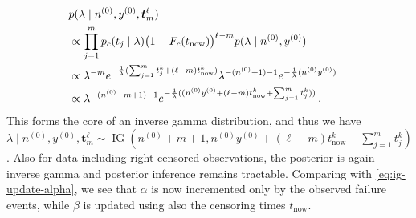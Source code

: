\documentclass[12pt,a4paper,twocolumn,fleqn]{narms}
\renewcommand{\vec}[1]{{\bm#1}}
\newcommand{\uz}{^{(0)}} %
\newcommand{\ig}{\operatorname{IG}}   %
\def\yz{y\uz}
\def\nz{n\uz}
\begin{document}
\begin{align}
\lefteqn{p(\lambda \mid \nz, \yz, \vec{t}_m^\ell)} \\
	&\propto \prod_{j=1}^{m} p_c(t_j \mid \lambda) \big(1 - F_c(t_\text{now})\big)^{\ell-m} p(\lambda\mid \nz, \yz) \\
	&\propto \lambda^{-m} e^{-\frac{1}{\lambda}(\sum_{j=1}^{m} t_j^k + (\ell-m) t_\text{now}^k)}
           \lambda^{-(\nz+1)-1}   e^{-\frac{1}{\lambda}(\nz \yz)} \\
	&\propto \lambda^{-(\nz+m+1)-1} e^{-\frac{1}{\lambda}((\nz \yz + (\ell-m) t_\text{now}^k + \sum_{j=1}^{m} t_j^k))} \,.
\end{align}
This forms the core of an inverse gamma distribution, and thus we have
$\lambda \mid \nz, \yz, \vec{t}_m^\ell \sim \ig\left(\nz + m + 1, \nz \yz + (\ell-m) t_\text{now}^k + \sum_{j=1}^{m}t_j^k \right)$.
Also for data including right-censored observations,
the posterior is again inverse gamma and posterior inference remains tractable.
Comparing with \eqref{eq:ig-update-alpha},
we see that $\alpha$ is now incremented only by the observed failure events,
while $\beta$ is updated using also the censoring times $t_\text{now}$.
\end{document}

